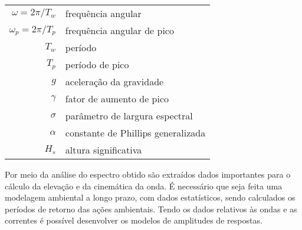 \begin{tabular}{rl}
	$\omega = 2\pi/T_w$   & frequência angular\\
	$\omega_p = 2\pi/T_p$ & frequência angular de pico\\
	$T_w$                 & período\\
	$T_p$                 & período de pico\\
	$g$                   & aceleração da gravidade\\
	$\gamma$              & fator de aumento de pico\\
	$\sigma$              & parâmetro de largura espectral\\
	$\alpha$              & constante de Phillips generalizada\\
	$H_s$                 & altura significativa
\end{tabular}



Por meio da análise do espectro obtido são extraídos dados importantes para o cálculo da elevação e da cinemática da onda.
É necessário que seja feita uma modelagem ambiental a longo prazo, com dados estatísticos, sendo calculados os períodos de retorno das ações ambientais.
Tendo os dados relativos às ondas e as correntes é possível desenvolver os modelos de amplitudes de respostas.
